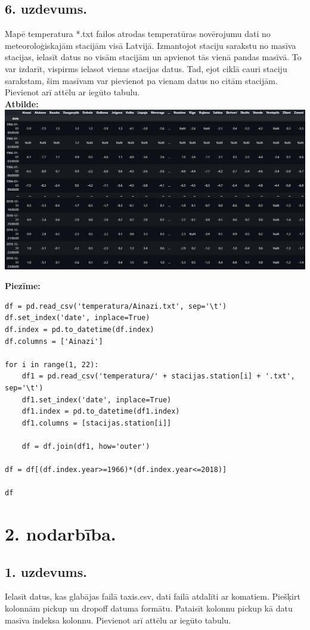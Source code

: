 \documentclass[12pt]{article}
\begin{document}
\subsection*{6. uzdevums.} Mapē temperatura *.txt failos atrodas temperatūras novērojumu dati no meteoroloģiskajām stacijām visā Latvijā. Izmantojot staciju sarakstu no masīva stacijas, ielasīt datus no visām stacijām un apvienot tās vienā pandas masīvā. To var izdarīt, vispirms ielasot vienas stacijas datus. Tad, ejot ciklā cauri staciju sarakstam, šim masīvam var pievienot pa vienam datus no citām stacijām. Pievienot arī attēlu ar iegūto tabulu.\\

\noindent \textbf{Atbilde:}\\
\includegraphics[width=1\textwidth]{6.uzd.png}

\noindent \textbf{Piezīme:}
\begin{verbatim}
df = pd.read_csv('temperatura/Ainazi.txt', sep='\t')
df.set_index('date', inplace=True)
df.index = pd.to_datetime(df.index)
df.columns = ['Ainazi']

for i in range(1, 22):
    df1 = pd.read_csv('temperatura/' + stacijas.station[i] + '.txt', sep='\t')
    df1.set_index('date', inplace=True)
    df1.index = pd.to_datetime(df1.index)
    df1.columns = [stacijas.station[i]]
    
    df = df.join(df1, how='outer')

df = df[(df.index.year>=1966)*(df.index.year<=2018)]

df
\end{verbatim}

\newpage
\section*{2. nodarbība.}

\subsection*{1. uzdevums.} Ielasīt datus, kas glabājas failā taxis.csv, dati failā atdalīti ar komatiem. Piešķirt kolonnām pickup un dropoff datuma formātu. Pataisīt kolonnu pickup kā datu masīva indeksa kolonnu. Pievienot arī attēlu ar iegūto tabulu.\\
\end{document}
